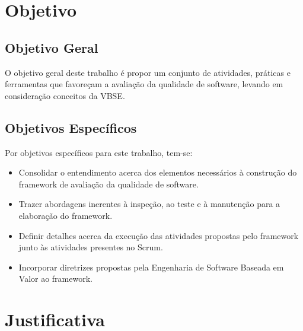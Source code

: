 \section{Objetivo}

\subsection{Objetivo Geral}

O objetivo geral deste trabalho é propor um conjunto de atividades, práticas e ferramentas que favoreçam a avaliação da qualidade de software, levando em consideração conceitos da VBSE.

\subsection{Objetivos Específicos}

Por objetivos específicos para este trabalho, tem-se:

\begin{itemize}
	\item Consolidar o entendimento acerca dos elementos necessários à construção do framework de avaliação da qualidade de software.
	\item Trazer abordagens inerentes à inspeção, ao teste e à manutenção para a elaboração do framework.
	\item Definir detalhes acerca da execução das atividades propostas pelo framework junto às atividades presentes no Scrum.
	\item Incorporar diretrizes propostas pela Engenharia de Software Baseada em Valor ao framework.
\end{itemize}

\section{Justificativa}